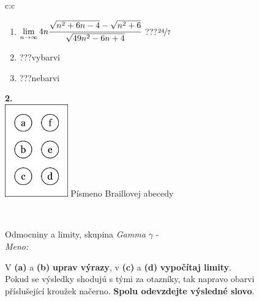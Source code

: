 \documentclass[10pt]{report}
\begin{document}
\begin{tabular}{c:c}
\begin{minipage}[c][104.5mm][t]{0.5\linewidth}
\begin{center}
\begin{minipage}{0.79\linewidth}
\begin{center}
\begin{varwidth}{\linewidth}
\begin{enumerate}
\item $\lim\limits_{n\to\infty}4n\cfrac{\sqrt{n^2+6n-4}-\sqrt{n^2+6}}{\sqrt{49n^2-6n+4}}$\quad \dotfill\; ???\;\dotfill \quad $\nicefrac{24}{7}$
\item \quad \dotfill\; ???\;\dotfill \quad vybarvi
\item \quad \dotfill\; ???\;\dotfill \quad nebarvi
\end{enumerate}
\end{varwidth}
\end{center}
\end{minipage}
\begin{minipage}{0.20\linewidth}
\begin{center}
{\Huge\bfseries 2.} \\[2mm]
\includegraphics[height=40mm]{../images/braille.png}
{\small Písmeno Braillovej abecedy}
\end{center}
\end{minipage}
\end{center}
\end{minipage}
\\ \hdashline
\begin{minipage}[c][104.5mm][t]{0.5\linewidth}
\begin{center}
\vspace{7mm}
{\huge Odmocniny a limity, skupina \textit{Gamma $\gamma$} -}\\[5mm]
\textit{Meno:}\phantom{xxxxxxxxxxxxxxxxxxxxxxxxxxxxxxxxxxxxxxxxxxxxxxxxxxxxxxxxxxxxxxxxx}\\[5mm]
\begin{minipage}{0.95\linewidth}
\begin{center}
V \textbf{(a)} a \textbf{(b)} \textbf{uprav výrazy}, v \textbf{(c)} a \textbf{(d)} \textbf{vypočítaj limity}.\\Pokud se výsledky shodujú s tými za otazníky, tak napravo obarvi\\příslušející kroužek načerno. \textbf{Spolu odevzdejte výsledné slovo}.
\end{center}
\end{minipage}
\\[1mm]

\end{center}
\end{minipage}
\end{tabular}
\end{document}
